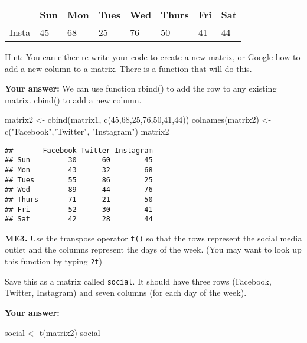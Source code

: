 \documentclass[
]{article}
\newenvironment{Shaded}{\begin{snugshade}}{\end{snugshade}}
\newcommand{\DecValTok}[1]{\textcolor[rgb]{0.00,0.00,0.81}{#1}}
\newcommand{\FunctionTok}[1]{\textcolor[rgb]{0.00,0.00,0.00}{#1}}
\newcommand{\NormalTok}[1]{#1}
\newcommand{\OtherTok}[1]{\textcolor[rgb]{0.56,0.35,0.01}{#1}}
\newcommand{\StringTok}[1]{\textcolor[rgb]{0.31,0.60,0.02}{#1}}
\begin{document}
\begin{longtable}[]{@{}llllllll@{}}
\toprule
& Sun & Mon & Tues & Wed & Thurs & Fri & Sat \\
\midrule
\endhead
Insta & 45 & 68 & 25 & 76 & 50 & 41 & 44 \\
\bottomrule
\end{longtable}

Hint: You can either re-write your code to create a new matrix, or
Google how to add a new column to a matrix. There is a function that
will do this.

\textbf{Your answer:} We can use function rbind() to add the row to any
existing matrix. cbind() to add a new column.

\begin{Shaded}
\begin{Highlighting}[]
\NormalTok{matrix2 }\OtherTok{\textless{}{-}} \FunctionTok{cbind}\NormalTok{(matrix1, }\FunctionTok{c}\NormalTok{(}\DecValTok{45}\NormalTok{,}\DecValTok{68}\NormalTok{,}\DecValTok{25}\NormalTok{,}\DecValTok{76}\NormalTok{,}\DecValTok{50}\NormalTok{,}\DecValTok{41}\NormalTok{,}\DecValTok{44}\NormalTok{))}
\FunctionTok{colnames}\NormalTok{(matrix2) }\OtherTok{\textless{}{-}} \FunctionTok{c}\NormalTok{(}\StringTok{"Facebook"}\NormalTok{,}\StringTok{"Twitter"}\NormalTok{, }\StringTok{"Instagram"}\NormalTok{)}
\NormalTok{matrix2}
\end{Highlighting}
\end{Shaded}

\begin{verbatim}
##       Facebook Twitter Instagram
## Sun         30      60        45
## Mon         43      32        68
## Tues        55      86        25
## Wed         89      44        76
## Thurs       71      21        50
## Fri         52      30        41
## Sat         42      28        44
\end{verbatim}

\textbf{ME3.} Use the transpose operator \texttt{t()} so that the rows
represent the social media outlet and the columns represent the days of
the week. (You may want to look up this function by typing \texttt{?t})

Save this as a matrix called \texttt{social}. It should have three rows
(Facebook, Twitter, Instagram) and seven columns (for each day of the
week).

\textbf{Your answer:}

\begin{Shaded}
\begin{Highlighting}[]
\NormalTok{social }\OtherTok{\textless{}{-}} \FunctionTok{t}\NormalTok{(matrix2)}
\NormalTok{social}
\end{Highlighting}
\end{Shaded}
\end{document}
